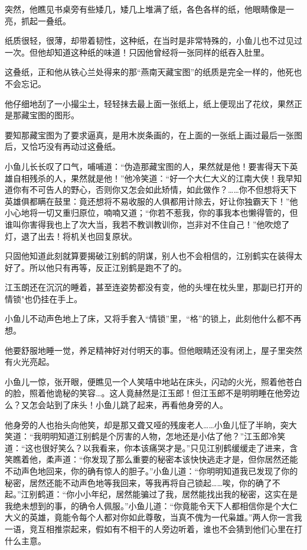 \documentclass[12pt,oneside]{book}
\begin{document}
突然，他瞧见书桌旁有些矮几，矮几上堆满了纸，各色各样的纸，他眼睛像是一亮，抓起一叠纸。

纸质很轻，很薄，却带着韧性，这种纸，在当时是非常特殊的，小鱼儿也不过见过一次。但他却知道这种纸的味道！只因他曾经将一张同样的纸吞入肚里。

这叠纸，正和他从铁心兰处得来的那``燕南天藏宝图''的纸质是完全一样的，他死也不会忘记。

他仔细地刮了一小撮尘土，轻轻抹去最上面一张纸上，纸上便现出了花纹，果然正是那藏宝图的图形。

要知那藏宝图为了要求逼真，是用木炭条画的，在上面的一张纸上画过最后一张图后，又恰巧没有再动过这叠纸。

小鱼儿长长叹了口气，哺哺道：``伪造那藏宝图的人，果然就是他！要害得天下英雄自相残杀的人，果然就是他！''他冷笑道：``好一个大仁大义的江南大侠！我早知道你有不可告人的野心，否则你又怎会如此矫情，如此做作？\ldots\ldots 你不但想将天下英雄俱都瞒在鼓里：竟还想将不易收服的人俱都用计除去，好让你独霸天下！''他小心地将一切又重归原位，喃喃又道；``你若不惹我，你的事我本也懒得管的，但谁叫你害得我也上了次大当，我若不教训教训你，岂非对不住自己！''他吹熄了灯，退了出去！将机关也回复原状。

只固他知道此刻就算要揭破江别鹤的阴谋，别人也不会相信的，江别鹤实在装得太好了。所以他只有再等，反正江别鹤是跑不了的。

江玉朗还在沉沉的睡着，甚至连姿势都没有变，他的头埋在枕头里，那副已打开的情锁"也仍挂在手上。

小鱼儿不动声色地上了床，又将手套入``情锁''里，``格''的锁上，此刻他什么都不再想。

他要舒服地睡一觉，养足精神好对付明天的事。但他眼睛还没有闭上，屋子里突然有火光亮起。

小鱼儿一惊，张开眼，便瞧见一个人笑嘻中地站在床头，闪动的火光，照着他苍白的脸，照着他诡秘的笑容\ldots。这人竟赫然是江玉郎！但江玉郎不是明明睡在他旁边么？又怎会站到了床头！小鱼儿跳了起来，再看他身旁的人。

他身旁的人也抬头向他笑，却是那又聋又哑的残废老人\ldots\ldots 小鱼儿怔了半晌，突大笑道：``我明明知道江别鹤是个厉害的人物，怎地还是小估了他？''江玉郎冷笑道：``这也很好笑么？以我看来，你本该痛哭才是。''只见江别鹤缓缓走了进来，含笑瞧着他，柔声道：``你发现了那么重要的秘密本该快快逃走才是，但你居然还能不动声色地回来，你的确有惊人的胆子。''小鱼儿道：``你明明知道我已发现了你的秘密，居然还能不动声色地等我回来，等我再将自己锁起\ldots\ldots 唉，你的确了不起。''江别鹤道：``你小小年纪，居然能骗过了我，居然能找出我的秘密，这实在是我绝未想到的事，的确令人佩服。''小鱼儿道：``你竟能令天下人都相信你是个大仁大义的英雄，竟能令每个人都对你如此尊敬，当真不傀为一代枭雄。''两人你一言我一语，竞互相推崇起来，假如有不相干的人旁边听着，谁也不会猜到他们心里在打什么主意。
\end{document}
